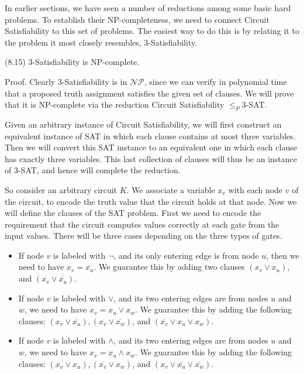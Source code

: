 \documentclass[a4paper, 12pt]{book}
\theoremstyle{dotless}
\begin{document}
In earlier sections, we have seen a number of reductions among some basic hard problems. To establish their NP-completeness, we need to connect Circuit Satisfiability to this set of problems. The easiest way to do this is by relating it to the problem it most closely resembles, 3-Satisfiability.

(8.15) 3-Satisfiability is NP-complete.

Proof. Clearly 3-Satisfiability is in $\mathcal{N P}$, since we can verify in polynomial time that a proposed truth assignment satisfies the given set of clauses. We will prove that it is NP-complete via the reduction Circuit Satisfiability $\leq_{P} 3$-SAT.

Given an arbitrary instance of Circuit Satisfiability, we will first construct an equivalent instance of SAT in which each clause contains at most three variables. Then we will convert this SAT instance to an equivalent one in which each clause has exactly three variables. This last collection of clauses will thus be an instance of 3-SAT, and hence will complete the reduction.

So consider an arbitrary circuit $K$. We associate a variable $x_{v}$ with each node $v$ of the circuit, to encode the truth value that the circuit holds at that node. Now we will define the clauses of the SAT problem. First we need to encode the requirement that the circuit computes values correctly at each gate from the input values. There will be three cases depending on the three types of gates.

\begin{itemize}
  \item If node $v$ is labeled with $\neg$, and its only entering edge is from node $u$, then we need to have $x_{v}=\overline{x_{u}}$. We guarantee this by adding two clauses $\left(x_{v} \vee x_{u}\right)$, and $\left(\overline{x_{v}} \vee \overline{x_{u}}\right)$.

  \item If node $v$ is labeled with $\vee$, and its two entering edges are from nodes $u$ and $w$, we need to have $x_{v}=x_{u} \vee x_{w}$. We guarantee this by adding the following clauses: $\left(x_{v} \vee \overline{x_{u}}\right),\left(x_{v} \vee \overline{x_{w}}\right)$, and $\left(\overline{x_{v}} \vee x_{u} \vee x_{w}\right)$.

  \item If node $v$ is labeled with $\wedge$, and its two entering edges are from nodes $u$ and $w$, we need to have $x_{v}=x_{u} \wedge x_{w}$. We guarantee this by adding the following clauses: $\left(\overline{x_{v}} \vee x_{u}\right),\left(\overline{x_{v}} \vee x_{w}\right)$, and $\left(x_{v} \vee \overline{x_{u}} \vee \overline{x_{w}}\right)$.

\end{itemize}
\end{document}
